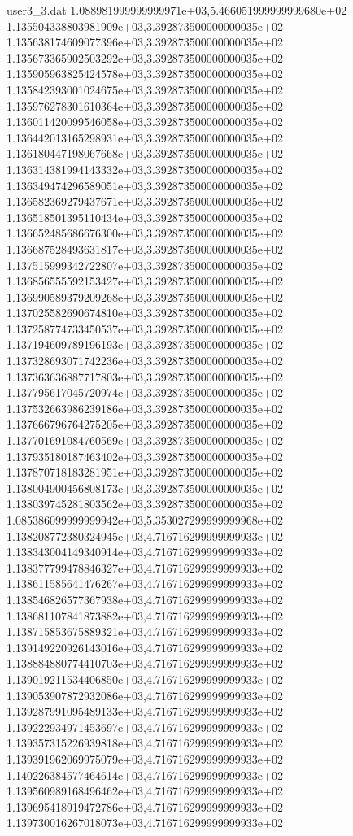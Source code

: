 \begin{filecontents}{user3_3.dat}
1.088981999999999971e+03,5.466051999999999680e+02
1.135504338803981909e+03,3.392873500000000035e+02
1.135638174609077396e+03,3.392873500000000035e+02
1.135673365902503292e+03,3.392873500000000035e+02
1.135905963825424578e+03,3.392873500000000035e+02
1.135842393001024675e+03,3.392873500000000035e+02
1.135976278301610364e+03,3.392873500000000035e+02
1.136011420099546058e+03,3.392873500000000035e+02
1.136442013165298931e+03,3.392873500000000035e+02
1.136180447198067668e+03,3.392873500000000035e+02
1.136314381994143332e+03,3.392873500000000035e+02
1.136349474296589051e+03,3.392873500000000035e+02
1.136582369279437671e+03,3.392873500000000035e+02
1.136518501395110434e+03,3.392873500000000035e+02
1.136652485686676300e+03,3.392873500000000035e+02
1.136687528493631817e+03,3.392873500000000035e+02
1.137515999342722807e+03,3.392873500000000035e+02
1.136856555592153427e+03,3.392873500000000035e+02
1.136990589379209268e+03,3.392873500000000035e+02
1.137025582690674810e+03,3.392873500000000035e+02
1.137258774733450537e+03,3.392873500000000035e+02
1.137194609789196193e+03,3.392873500000000035e+02
1.137328693071742236e+03,3.392873500000000035e+02
1.137363636887717803e+03,3.392873500000000035e+02
1.137795617045720974e+03,3.392873500000000035e+02
1.137532663986239186e+03,3.392873500000000035e+02
1.137666796764275205e+03,3.392873500000000035e+02
1.137701691084760569e+03,3.392873500000000035e+02
1.137935180187463402e+03,3.392873500000000035e+02
1.137870718183281951e+03,3.392873500000000035e+02
1.138004900456808173e+03,3.392873500000000035e+02
1.138039745281803562e+03,3.392873500000000035e+02
1.085386099999999942e+03,5.353027299999999968e+02
1.138208772380324945e+03,4.716716299999999933e+02
1.138343004149340914e+03,4.716716299999999933e+02
1.138377799478846327e+03,4.716716299999999933e+02
1.138611585641476267e+03,4.716716299999999933e+02
1.138546826577367938e+03,4.716716299999999933e+02
1.138681107841873882e+03,4.716716299999999933e+02
1.138715853675889321e+03,4.716716299999999933e+02
1.139149220926143016e+03,4.716716299999999933e+02
1.138884880774410703e+03,4.716716299999999933e+02
1.139019211534406850e+03,4.716716299999999933e+02
1.139053907872932086e+03,4.716716299999999933e+02
1.139287991095489133e+03,4.716716299999999933e+02
1.139222934971453697e+03,4.716716299999999933e+02
1.139357315226939818e+03,4.716716299999999933e+02
1.139391962069975079e+03,4.716716299999999933e+02
1.140226384577464614e+03,4.716716299999999933e+02
1.139560989168496462e+03,4.716716299999999933e+02
1.139695418919472786e+03,4.716716299999999933e+02
1.139730016267018073e+03,4.716716299999999933e+02

\end{filecontents}
